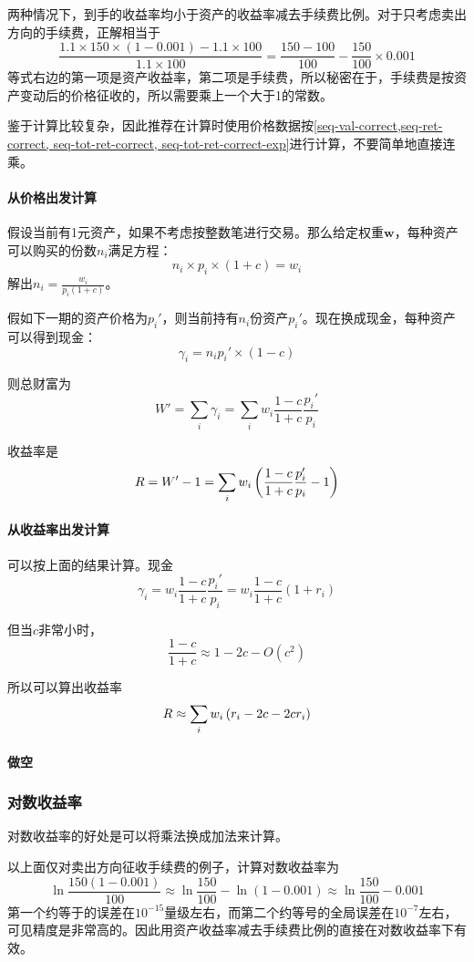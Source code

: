 两种情况下，到手的收益率均小于资产的收益率减去手续费比例。对于只考虑卖出方向的手续费，正解相当于
$$\frac{1.1\times 150\times(1-0.001)-1.1\times 100}{1.1\times 100}=\frac{150-100}{100}-\frac{150}{100}\times 0.001$$
等式右边的第一项是资产收益率，第二项是手续费，所以秘密在于，手续费是按资产变动后的价格征收的，所以需要乘上一个大于1的常数。

鉴于计算比较复杂，因此推荐在计算时使用价格数据按\eqref{seq-val-correct,seq-ret-correct, seq-tot-ret-correct, seq-tot-ret-correct-exp}进行计算，不要简单地直接连乘。

\paragraph*{从价格出发计算}假设当前有1元资产，如果不考虑按整数笔进行交易。那么给定权重$\bm{w}$，每种资产可以购买的份数$n_i$满足方程：
$$n_i\times p_i \times(1+c)=w_i$$
解出$n_i=\frac{w_i}{p_i(1+c)}$。

假如下一期的资产价格为$p_i'$，则当前持有$n_i$份资产$p_i'$。现在换成现金，每种资产可以得到现金：
$$\gamma_i=n_ip_i'\times(1-c)$$

则总财富为$$W'=\sum_i \gamma_i=\sum_i w_i\frac{1-c}{1+c}\frac{p_i'}{p_i}$$

收益率是$$R=W'-1=\sum_i w_i\left(\frac{1-c}{1+c}\frac{p_i'}{p_i}-1\right)$$

\paragraph*{从收益率出发计算}可以按上面的结果计算。现金
$$\gamma_i=w_i\frac{1-c}{1+c}\frac{p_i'}{p_i}=w_i\frac{1-c}{1+c}(1+r_i)$$

但当$c$非常小时，$$\frac{1-c}{1+c}\approx1- 2c-O(c^2)$$

所以可以算出收益率
$$R\approx \sum_i w_i\left(r_i-2c-2cr_i\right)$$

\paragraph*{做空}

\subsubsection{对数收益率}
对数收益率的好处是可以将乘法换成加法来计算。

以上面仅对卖出方向征收手续费的例子，计算对数收益率为
$$\ln \frac{150(1-0.001)}{100}\approx\ln\frac{150}{100}-\ln(1-0.001)\approx \ln\frac{150}{100}-0.001$$
第一个约等于的误差在$10^{-15}$量级左右，而第二个约等号的全局误差在$10^{-7}$左右，可见精度是非常高的。因此用资产收益率减去手续费比例的直接在对数收益率下有效。

